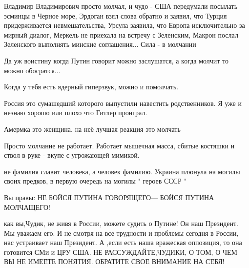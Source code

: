  
 
 
 
 




Владимир Владимирович просто молчал, и чудо - США передумали посылать эсминцы в
Черное море, Эрдоган взял слова обратно и заявил, что Турция придерживается
невмешательства, Урсула заявила, что Европа исключительно за мирный диалог,
Меркель не приехала на встречу с Зеленским, Макрон послал Зеленского выполнять
минские соглашения...  Сила - в молчании

Да уж воистину когда Путин говорит можно заслушатся, а когда молчит то можно
обосратся...

Когда у тебя есть ядерный гиперзвук, можно и помолчать.

Россия это сумашедший которого выпустили навестить родственников.
Я уже и незнаю хорошо или плохо что Гитлер проиграл.

Амермка это женщина, на неё лучшая реакция это молчать

Просто молчание не работает. Работает мышечная масса, сбитые костяшки и ствол в руке - вкупе с угрожающей мимикой.

не фамилия славит человека, а человек фамилию. Украина плюнула на могилы своих
предков, в первую очередь  на могилы " героев СССР "

Вы правы: НЕ БОЙСЯ ПУТИНА ГОВОРЯЩЕГО--- БОЙСЯ ПУТИНА  МОЛЧАЩЕГО!

как вы,Чудик, не живя в России, можете судить о Путине! Он наш Президент. Мы уважаем его. И не смотря на все трудности и проблемы сегодня в России, нас устраивает наш Президент. А ,если есть наша вражеская оппозиция, то она готовится СМи и ЦРУ США. 
НЕ РАССУЖДАЙТЕ,ЧУДИКИ, О ТОМ, О ЧЕМ ВЫ НЕ ИМЕЕТЕ ПОНЯТИЯ.
ОБРАТИТЕ СВОЕ ВНИМАНИЕ НА СЕБЯ!

